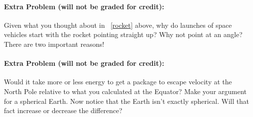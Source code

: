 \documentclass[12pt]{article}
\begin{document}
\paragraph{Extra Problem (will not be graded for credit):}%
Given what you thought about in \problemname~\ref{rocket} above, why do launches
of space vehicles start with the rocket pointing straight up? Why not
point at an angle? There are two important reasons!

\paragraph{Extra Problem (will not be graded for credit):}%
Would it take more or less energy to get a package to escape velocity
at the North Pole relative to what you calculated at the Equator? Make
your argument for a spherical Earth. Now notice that the Earth isn't
exactly spherical. Will that fact increase or decrease the difference?
\end{document}
